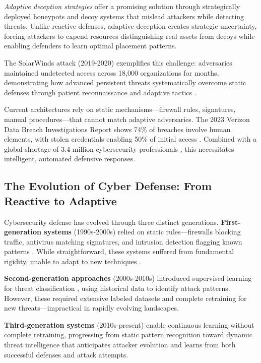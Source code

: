 \documentclass[12pt,oneside]{article}
\begin{document}
\textit{Adaptive deception strategies} offer a promising solution through strategically deployed honeypots and decoy systems that mislead attackers while detecting threats. Unlike reactive defenses, adaptive deception creates strategic uncertainty, forcing attackers to expend resources distinguishing real assets from decoys while enabling defenders to learn optimal placement patterns.

The SolarWinds attack (2019-2020) exemplifies this challenge: adversaries maintained undetected access across 18,000 organizations for months, demonstrating how advanced persistent threats systematically overcome static defenses through patient reconnaissance and adaptive tactics \cite{alpcan2010network,sommer2010outside}. 

Current architectures rely on static mechanisms—firewall rules, signatures, manual procedures—that cannot match adaptive adversaries. The 2023 Verizon Data Breach Investigations Report shows 74\% of breaches involve human elements, with stolen credentials enabling 50\% of initial access \cite{beltran2025cyber}. Combined with a global shortage of 3.4 million cybersecurity professionals \cite{zhang2024survey}, this necessitates intelligent, automated defensive responses.


\subsection{The Evolution of Cyber Defense: From Reactive to Adaptive}

Cybersecurity defense has evolved through three distinct generations. \textbf{First-generation systems} (1990s-2000s) relied on static rules—firewalls blocking traffic, antivirus matching signatures, and intrusion detection flagging known patterns \cite{alpcan2010network}. While straightforward, these systems suffered from fundamental rigidity, unable to adapt to new techniques \cite{sommer2010outside}.

\textbf{Second-generation approaches} (2000s-2010s) introduced supervised learning for threat classification \cite{sommer2010outside}, using historical data to identify attack patterns. However, these required extensive labeled datasets and complete retraining for new threats—impractical in rapidly evolving landscapes.

\textbf{Third-generation systems} (2010s-present) enable continuous learning without complete retraining, progressing from static pattern recognition toward dynamic threat intelligence that anticipates attacker evolution and learns from both successful defenses and attack attempts.
\end{document}
